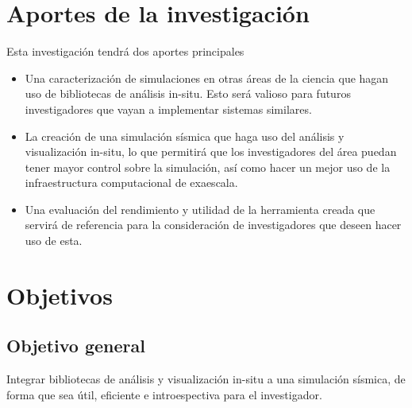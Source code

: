 
\section{Aportes de la investigación}
Esta investigación tendrá dos aportes principales
\begin{itemize}
  \item Una caracterización de simulaciones en otras áreas de la ciencia que hagan uso de bibliotecas de análisis in-situ. Esto será valioso para futuros investigadores que vayan a implementar sistemas similares. 
  \item La creación de una simulación sísmica que haga uso del análisis y visualización in-situ, lo que permitirá que los investigadores del área puedan tener mayor control sobre la simulación, así como hacer un mejor uso de la infraestructura computacional de exaescala. 
  \item Una evaluación del rendimiento y utilidad de la herramienta creada que servirá de referencia para la consideración de investigadores que deseen hacer uso de esta. 
  
\end{itemize}

\section{Objetivos}
\subsection{Objetivo general}
Integrar bibliotecas de análisis y visualización in-situ a una simulación sísmica, de forma que sea útil, eficiente e introespectiva para el investigador.
